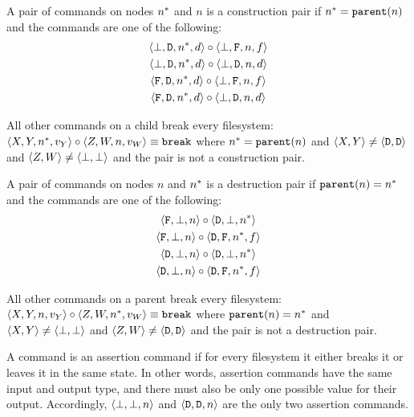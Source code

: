 \begin{mydef}
A pair of commands on nodes $n^*$ and $n$ is a construction pair if $n^*=\mathtt{parent}(n)$ 
and the commands are one
of the following:
   \begin{gather*}
            \langle{\bot,\mathtt{D},n^*,d}\rangle\circ  \langle{\bot,\mathtt{F},n,f}\rangle \\
            \langle{\bot,\mathtt{D},n^*,d}\rangle\circ  \langle{\bot,\mathtt{D},n,d}\rangle \\
            \langle{\mathtt{F},\mathtt{D},n^*,d}\rangle\circ  \langle{\bot,\mathtt{F},n,f}\rangle \\
            \langle{\mathtt{F},\mathtt{D},n^*,d}\rangle\circ  \langle{\bot,\mathtt{D},n,d}\rangle
   \end{gather*}
\end{mydef}

\begin{myax}\label{ax_directchild_breaks}
All other commands on a child break every filesystem:
$\langle{X,Y,n^*,v_Y}\rangle\circ\langle{Z,W,n,v_W}\rangle \equiv \mathtt{break}$ where $n^*=\mathtt{parent}(n)$ and $\langle{X,Y}\rangle\neq\langle{\mathtt{D},\mathtt{D}}\rangle$ and $\langle{Z,W}\rangle\neq\langle{\bot,\bot}\rangle$
and the pair is not a construction pair.
\end{myax}

\begin{mydef}
A pair of commands on nodes $n$ and $n^*$ is a destruction pair if $\mathtt{parent}(n)=n^*$ and the commands are one
of the following:
   \begin{gather*}
            \langle{\mathtt{F},\bot,n}\rangle\circ  \langle{\mathtt{D},\bot,n^*}\rangle \\
            \langle{\mathtt{F},\bot,n}\rangle\circ  \langle{\mathtt{D},\mathtt{F},n^*,f}\rangle \\
            \langle{\mathtt{D},\bot,n}\rangle\circ  \langle{\mathtt{D},\bot,n^*}\rangle \\
            \langle{\mathtt{D},\bot,n}\rangle\circ  \langle{\mathtt{D},\mathtt{F},n^*,f}\rangle
   \end{gather*}
\end{mydef}

\begin{myax}\label{ax_directparent_breaks}
All other commands on a parent break every filesystem:
$\langle{X,Y,n,v_Y}\rangle\circ\langle{Z,W,n^*,v_W}\rangle \equiv \mathtt{break}$ where $\mathtt{parent}(n)=n^*$ and $\langle{X,Y}\rangle\neq\langle{\bot,\bot}\rangle$ and $\langle{Z,W}\rangle\neq\langle{\mathtt{D},\mathtt{D}}\rangle$
and the pair is not a destruction pair.
\end{myax}

\begin{mydef}
A command is an assertion command if
for every filesystem it either breaks it or leaves it in the same state.
In other words, assertion commands have the same input and output type,
and there must also be only one possible value for their output.
Accordingly, $\langle{\bot,\bot,n}\rangle$ and $\langle{\mathtt{D},\mathtt{D},n}\rangle$ are the only two assertion commands.
\end{mydef}

